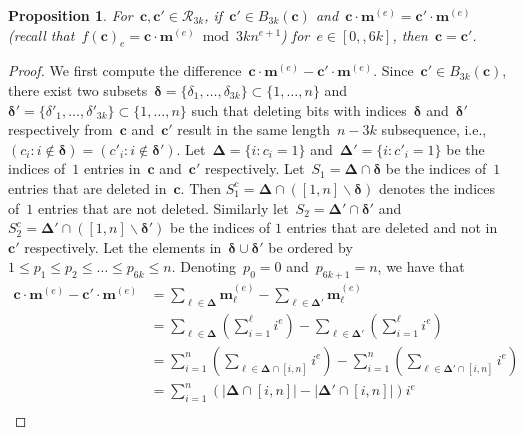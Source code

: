 \documentclass[10pt,a4paper,onecolumn]{IEEEtran}
\newtheorem{proposition}{Proposition}
\newcommand{\1}{\mathbbold{1}}
\newcommand{\boldc}{\mathbf{c}}
\newcommand{\boldm}{\mathbf{m}}
\begin{document}
\begin{proposition}\label{lemma:vtextension}
For~$\boldc,\boldc'\in \mathcal{R}_{3k}$, if~$\boldc'\in B_{3k}(\boldc)$ and~$ \boldc \cdot \boldm^{(e)}= \boldc' \cdot \boldm^{(e)}$ (recall that~$f(\boldc)_e=\boldc \cdot \boldm^{(e)}\bmod 3kn^{e+1}$) for~$e\in [0,,6k]$, then~$\boldc=\boldc'$.
\end{proposition}
\begin{proof}
We first compute the difference~$ \boldc \cdot \boldm^{(e)}- \boldc' \cdot  \boldm^{(e)}$.
Since~$\boldc'\in B_{3k}(\boldc)$, there exist two subsets~$\boldsymbol{\delta}=\{\delta_{1},\ldots,\delta_{3k}\}\subset \{1,\ldots,n\}$ and~$\boldsymbol{\delta}'=\{\delta'_{1},\ldots,\delta'_{3k}\}\subset \{1,\ldots,n\}$ such that deleting bits with indices~$\boldsymbol{\delta}$ and~$\boldsymbol{\delta}'$ respectively from~$\boldc$ and~$\boldc'$ result in the same length~$n-3k$ subsequence, i.e.,~$(c_i:i\notin\boldsymbol{\delta})=(c'_i:i\notin\boldsymbol{\delta'})$. Let~$\boldsymbol{\Delta}=\{i:c_i=1\}$ and~$\boldsymbol{\Delta}'=\{i:c'_i=1\}$ be the indices of~$1$ entries in~$\boldc$ and~$\boldc'$ respectively.
Let~$S_1=\boldsymbol{\Delta}\cap \boldsymbol{\delta}$ %
be the indices of~$1$ entries that are deleted in~$\boldc$. Then
$S^c_1=\boldsymbol{\Delta}\cap ([1,n]\backslash \boldsymbol{\delta})$ denotes the indices of~$1$ entries  that are not deleted. Similarly let~$S_2=\boldsymbol{\Delta}'\cap \boldsymbol{\delta}'$ and~$S^c_2=\boldsymbol{\Delta}'\cap ([1,n]\backslash \boldsymbol{\delta}')$ be the indices of $1$ entries that are deleted and not in~$\boldc'$ respectively.
Let the elements in~$\boldsymbol{\delta}\cup \boldsymbol{\delta'}$ be ordered by~$1\le p_1\le p_2\le\ldots\le p_{6k}\le n$. Denoting~$p_0=0$ and~$p_{6k+1}=n$, we have that
\begin{align}\label{equation:difference}
    \boldc \cdot \boldm^{(e)}- \boldc' \cdot  \boldm^{(e)}&=\sum_{\ell\in \boldsymbol{\Delta}}\boldm^{(e)}_\ell - \sum_{\ell\in\boldsymbol{ \Delta}'}\boldm^{(e)}_\ell
    \nonumber\\
    &=\sum_{\ell\in \boldsymbol{\Delta}}(\sum^\ell_{i=1}i^e) - \sum_{\ell\in\boldsymbol{ \Delta}'}(\sum^\ell_{i=1}i^e)\nonumber\\
    &=\sum^n_{i=1}(\sum_{\ell\in \boldsymbol{\Delta}\cap[i,n]}i^e) - \sum^n_{i=1}(\sum_{\ell\in \boldsymbol{\Delta'}\cap [i,n]}i^e)\nonumber\\
    &=\sum^n_{i=1}(|\boldsymbol{\Delta}\cap[i,n]|-|\boldsymbol{\Delta}'\cap[i,n]|)i^e \nonumber\\

\end{align}
\end{proof}
\end{document}
